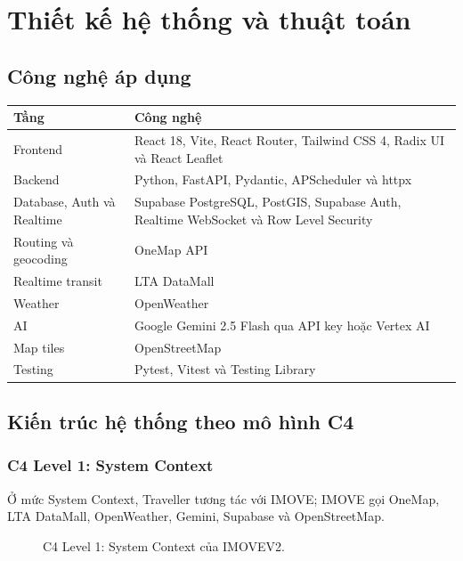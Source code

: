 \documentclass[12pt,a4paper]{article}
\begin{document}
\section{Thiết kế hệ thống và thuật toán}

\subsection{Công nghệ áp dụng}


\begin{longtable}{|L{3.6cm}|L{11.0cm}|}
\hline
\textbf{Tầng} & \textbf{Công nghệ} \\ \hline
\endhead
Frontend & React 18, Vite, React Router, Tailwind CSS 4, Radix UI và React Leaflet \\ \hline
Backend & Python, FastAPI, Pydantic, APScheduler và httpx \\ \hline
Database, Auth và Realtime & Supabase PostgreSQL, PostGIS, Supabase Auth, Realtime WebSocket và Row Level Security \\ \hline
Routing và geocoding & OneMap API \\ \hline
Realtime transit & LTA DataMall \\ \hline
Weather & OpenWeather \\ \hline
AI & Google Gemini 2.5 Flash qua API key hoặc Vertex AI \\ \hline
Map tiles & OpenStreetMap \\ \hline
Testing & Pytest, Vitest và Testing Library \\ \hline
\end{longtable}

\subsection{Kiến trúc hệ thống theo mô hình C4}


\subsubsection{C4 Level 1: System Context}

Ở mức System Context, Traveller tương tác với IMOVE; IMOVE gọi OneMap, LTA DataMall, OpenWeather, Gemini, Supabase và OpenStreetMap.

\begin{figure}[H]
\centering
{}
\caption{C4 Level 1: System Context của IMOVEV2.}
\label{fig:c4-context}
\end{figure}
\end{document}
